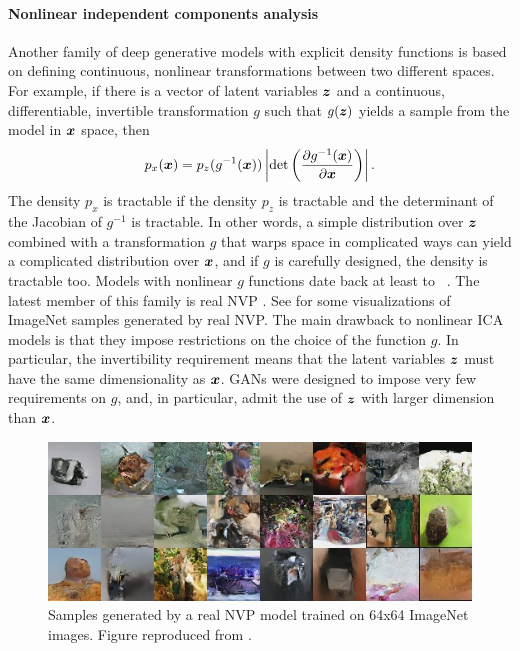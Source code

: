 \paragraph{Nonlinear independent components analysis}
Another family of deep generative models with explicit density functions is based on
defining continuous, nonlinear transformations between two different spaces.
For example, if there is a vector of latent variables ${\bm{z}}$ and a continuous, differentiable,
invertible transformation
$g$ such that $g({\bm{z}})$ yields a sample from the model in ${\bm{x}}$ space,
then
\begin{equation}
  \label{eq:change-of-variable}
  p_x({\bm{x}}) = p_z(g^{-1}({\bm{x}})) \left| \mathrm{det}
  \left( \frac{\partial g^{-1}({\bm{x}})} {\partial {\bm{x}}}\right) \right|. 
\end{equation}
The density $p_x$ is tractable if the density $p_z$ is tractable
and the determinant of the Jacobian of $g^{-1}$ is tractable.
In other words, a simple distribution over ${\bm{z}}$ combined with
a transformation $g$ that warps space in complicated ways can yield
a complicated distribution over ${\bm{x}}$, and if $g$ is carefully designed,
the density is tractable too.
Models with nonlinear $g$ functions date back at least to
~\citet{hyvarinen1999nonlinear}.
The latest member of this family is real NVP \citep{dinh2016density}.
See  for some visualizations of ImageNet samples
generated by real NVP.
The main drawback to nonlinear ICA models is that they impose restrictions
on the choice of the function $g$. In particular, the invertibility requirement
means that the latent variables ${\bm{z}}$ must have the same dimensionality as ${\bm{x}}$.
GANs were designed to impose very few requirements on $g$, and, in particular,
admit the use of ${\bm{z}}$ with larger dimension than ${\bm{x}}$.

\begin{figure}
\centering
\includegraphics[width=\textwidth]{fig_imnet_64_samples}
\caption{Samples generated by a real NVP model trained on 64x64 ImageNet images.
Figure reproduced from \citet{dinh2016density}.}
\label{fig:nvp}
\end{figure}

